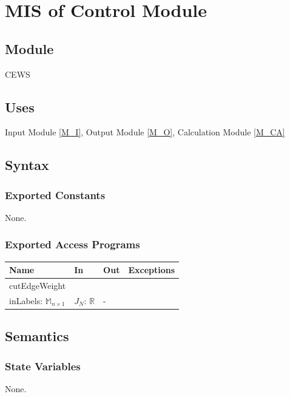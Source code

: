 \documentclass[12pt, titlepage]{article}
\begin{document}
\newpage
  \section{MIS of Control Module} \label{M_CO}

\subsection{Module}
CEWS

\subsection{Uses}

Input Module \ref{M_I}, Output Module \ref{M_O}, Calculation Module \ref{M_CA}

\subsection{Syntax}

\subsubsection{Exported Constants}
None.

\subsubsection{Exported Access Programs}

\begin{center}
\begin{tabular}{p{3cm} p{4cm} p{4cm} p{2cm}}
\hline
\textbf{Name} & \textbf{In} & \textbf{Out} & \textbf{Exceptions} \\
\hline
cutEdgeWeight & \makecell[1]{inData: $\mathbb{M}_{n \times m}$, \\ inLabels: $\mathbb{M}_{n \times 1}$} & $J_N$: $\mathbb{R}$  & - \\
\hline
\end{tabular}
\end{center}

\subsection{Semantics}

\subsubsection{State Variables}
None.
\end{document}
